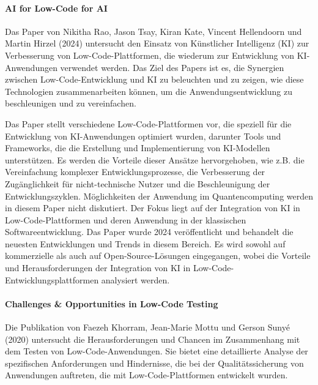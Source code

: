 \paragraph{AI for Low-Code for AI}

Das Paper von Nikitha Rao, Jason Tsay, Kiran Kate, Vincent Hellendoorn und Martin Hirzel (2024) \cite{rao2024} untersucht den Einsatz 
von Künstlicher Intelligenz (KI) zur Verbesserung von Low-Code-Plattformen, die wiederum zur Entwicklung von KI-Anwendungen 
verwendet werden. Das Ziel des Papers ist es, die Synergien zwischen Low-Code-Entwicklung und KI zu beleuchten und zu 
zeigen, wie diese Technologien zusammenarbeiten können, um die Anwendungsentwicklung zu beschleunigen und zu vereinfachen.

Das Paper stellt verschiedene Low-Code-Plattformen vor, die speziell für die Entwicklung von KI-Anwendungen optimiert wurden, 
darunter Tools und Frameworks, die die Erstellung und Implementierung von KI-Modellen unterstützen. 
Es werden die Vorteile dieser Ansätze hervorgehoben, wie z.B. die Vereinfachung komplexer Entwicklungsprozesse, 
die Verbesserung der Zugänglichkeit für nicht-technische Nutzer und die Beschleunigung der Entwicklungszyklen. 
Möglichkeiten der Anwendung im Quantencomputing werden in diesem Paper nicht diskutiert. 
Der Fokus liegt auf der Integration von KI in Low-Code-Plattformen und deren Anwendung in der klassischen Softwareentwicklung. 
Das Paper wurde 2024 veröffentlicht und behandelt die neuesten Entwicklungen und Trends in diesem Bereich. 
Es wird sowohl auf kommerzielle als auch auf Open-Source-Lösungen eingegangen, wobei die 
Vorteile und Herausforderungen der Integration von KI in Low-Code-Entwicklungsplattformen analysiert werden.

\paragraph{Challenges \& Opportunities in Low-Code Testing}

Die Publikation von Faezeh Khorram, Jean-Marie Mottu und Gerson Sunyé (2020) \cite{Khorram_2020} untersucht die Herausforderungen und Chancen 
im Zusammenhang mit dem Testen von Low-Code-Anwendungen. Sie bietet eine detaillierte Analyse der spezifischen Anforderungen 
und Hindernisse, die bei der Qualitätssicherung von Anwendungen auftreten, die mit Low-Code-Plattformen entwickelt wurden.

